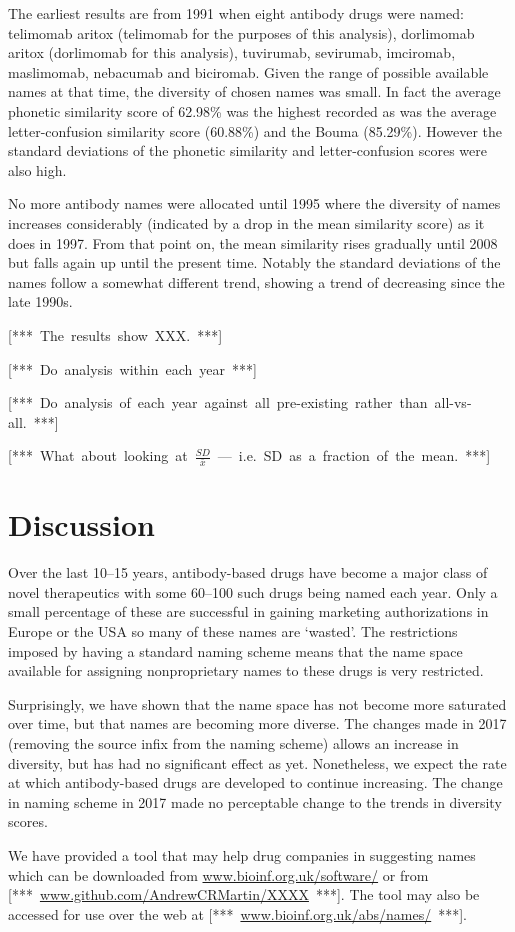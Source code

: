 \documentclass{article}
\newcommand{\note}[1]{\mbox{\color{red}[*** #1 ***]}}
\begin{document}
The earliest results are from 1991 when eight antibody drugs were
named: telimomab aritox (telimomab for the purposes of this analysis),
dorlimomab aritox (dorlimomab for this analysis), tuvirumab,
sevirumab, imciromab, maslimomab, nebacumab and biciromab. Given the
range of possible available names at that time, the diversity of
chosen names was small. In fact the average phonetic similarity score
of 62.98\% was the highest recorded as was the average
letter-confusion similarity score (60.88\%) and the Bouma
(85.29\%). However the standard deviations of the phonetic similarity
and letter-confusion scores were also high.

No more antibody names were allocated until 1995 where the diversity
of names increases considerably (indicated by a drop in the mean
similarity score) as it does in 1997. From that point on, the mean
similarity rises gradually until 2008 but falls again up until the
present time. Notably the standard deviations of the names follow a
somewhat different trend, showing a trend of decreasing since the late
1990s. 


\note{The results show XXX.}

\note{Do analysis within each year}

\note{Do analysis of each year against all pre-existing rather than
  all-vs-all.}

\note{What about looking at $\frac{SD}{\bar{x}}$ --- i.e. SD as a
  fraction of the mean.} 

\section{Discussion}
Over the last 10--15 years, antibody-based drugs have become a major
class of novel therapeutics with some 60--100 such drugs being named
each year. Only a small percentage of these are successful in gaining
marketing authorizations in Europe or the USA so many of these names
are `wasted'. The restrictions imposed by having a standard naming
scheme means that the name space available for assigning
nonproprietary names to these drugs is very restricted.

Surprisingly, we have shown that the name space has not become more
saturated over time, but that names are becoming more diverse.  The
changes made in 2017 (removing the source infix from the naming
scheme) allows an increase in diversity, but has had no significant
effect as yet. Nonetheless, we expect the rate at which antibody-based
drugs are developed to continue increasing. The change in naming
scheme in 2017 made no perceptable change to the trends in diversity
scores.

We have provided a tool that may help drug companies in suggesting
names which can be downloaded from \url{www.bioinf.org.uk/software/}
or from \note{\url{www.github.com/AndrewCRMartin/XXXX}}. The tool may also be
accessed for use over the web at \note{\url{www.bioinf.org.uk/abs/names/}}.



\end{document}
